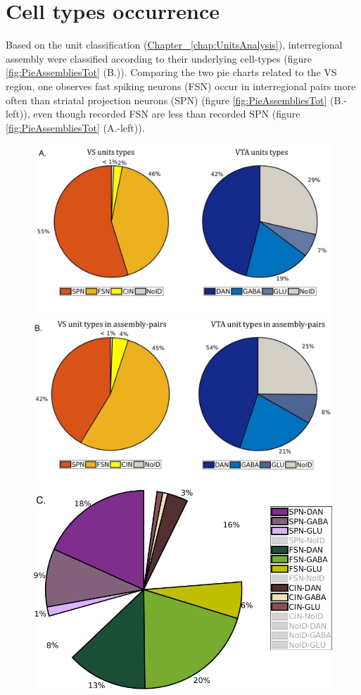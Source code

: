 \section{Cell types occurrence}
Based on the unit classification (\hyperref[chap:UnitsAnalysis]{Chapter~ \ref*{chap:UnitsAnalysis}}), interregional assembly were classified according to their underlying cell-types (figure \ref{fig:PieAssembliesTot} (B.)).
Comparing the two pie charts related to the VS region, one observes fast spiking neurons (FSN) occur in interregional pairs more often than striatal projection neurons (SPN) (figure \ref{fig:PieAssembliesTot} (B.-left)), even though recorded FSN are less than recorded SPN (figure \ref{fig:PieAssembliesTot} (A.-left)).
\label{sec:CellTypesOcc}
\begin{figure}[H]
    \centering
    \includegraphics[scale=0.35]{figures/PieRegions1.pdf}
    \includegraphics[scale=0.35]{figures/PieAsNotAs.pdf}
    \includegraphics[scale=0.35]{figures/PieAssembliesTot1.png}

\end{figure}
